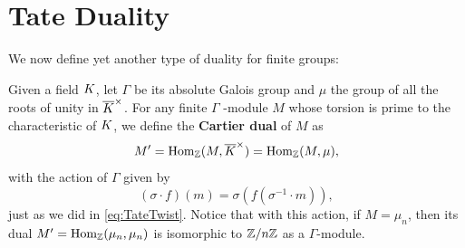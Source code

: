 \documentclass[a4paper, oneside]{memoir}
\begin{document}
\section{Tate Duality}
We now define yet another type of duality for finite groups:
\begin{definition}
    Given a field \(K\), let  $\Gamma$ be its absolute Galois group and $\mu$ the group of all the roots of unity in $\overline{K}^\times$.
    For any finite \(\Gamma\) -module \(M\) whose torsion is prime to the characteristic of \(K\), we define the \textbf{Cartier dual} of $M$ as
    \begin{equation*}
        M^{\prime} = \operatorname{Hom}_{\mathbb{Z}}(M, \overline{K}^\times)=\operatorname{Hom}_{\mathbb{Z}}(M, \mu),
    \end{equation*}
    with the action of $\Gamma$ given by
    \begin{equation*}
        (\sigma \cdot f)(m) = \sigma(f(\sigma^{-1}\cdot m)),
    \end{equation*}
    just as we did in \eqref{eq:TateTwist}.
    Notice that with this action, if $M=\mu_n$, then its dual $M^{\prime} = \operatorname{Hom}_{\mathbb{Z}}(\mu_n, \mu_n)$ is isomorphic to $\mathbb{Z}/n\mathbb{Z}$ as a $\Gamma$-module.
\end{definition}
\end{document}
